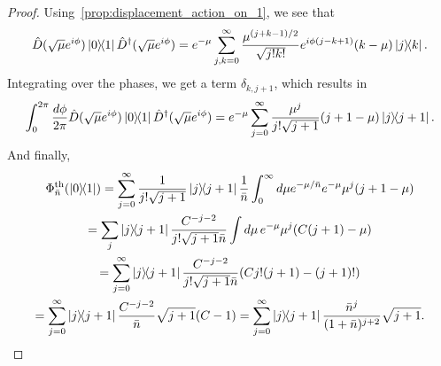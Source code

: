 \documentclass[12pt]{report}
\begin{document}
\begin{proof}
	Using~\cref{prop:displacement_action_on_1}, we see that
	\begin{equation}
		\hat D(\sqrt\mu e^{i\phi})\ketbra{0}{1} \hat D^\dagger(\sqrt\mu e^{i\phi})
		= e^{-\mu} \sum_{j,k=0}^\infty
		\frac{\mu^{(j+k-1)/2}}{\sqrt{j!k!}}
		e^{i\phi(j-k+1)} (k-\mu) \ketbra{j}{k}.
	\end{equation}
	Integrating over the phases, we get a term $\delta_{k,j+1}$, which results in
	\begin{equation}
		\int_0^{2\pi} \frac{d\phi}{2\pi}
		\hat D(\sqrt\mu e^{i\phi})\ketbra{0}{1} \hat D^\dagger(\sqrt\mu e^{i\phi})
		= e^{-\mu} \sum_{j=0}^\infty
		\frac{\mu^j}{j!\sqrt{j+1}} (j+1-\mu) \ketbra{j}{j+1}.
	\end{equation}
	And finally,
	\begin{equation}
	\begin{gathered}
		\Phi^{\rm th}_{\bar n}(\ketbra{0}{1})
		= \sum_{j=0}^\infty \frac{1}{j!\sqrt{j+1}} \ketbra{j}{j+1} \frac{1}{\bar n}
		\int_0^\infty d\mu
		e^{-\mu/\bar n} e^{-\mu} \mu^j (j+1-\mu) \\
		= \sum_j \ketbra{j}{j+1} \frac{C^{-j-2}}{j!\sqrt{j+1}\bar n}
		\int d\mu \, e^{-\mu} \mu^j (C(j+1) - \mu) \\
		= \sum_{j=0}^\infty \ketbra{j}{j+1} \frac{C^{-j-2}}{j!\sqrt{j+1}\bar n}
		(C j! (j+1) - (j+1)!) \\
		= \sum_{j=0}^\infty \ketbra{j}{j+1} \frac{C^{-j-2}}{\bar n} \sqrt{j+1} (C-1)
		= \sum_{j=0}^\infty \ketbra{j}{j+1}
			\frac{\bar n^{j}}{(1+\bar n)^{j+2}} \sqrt{j+1}.
	\end{gathered}
	\end{equation}
\end{proof}
\end{document}
